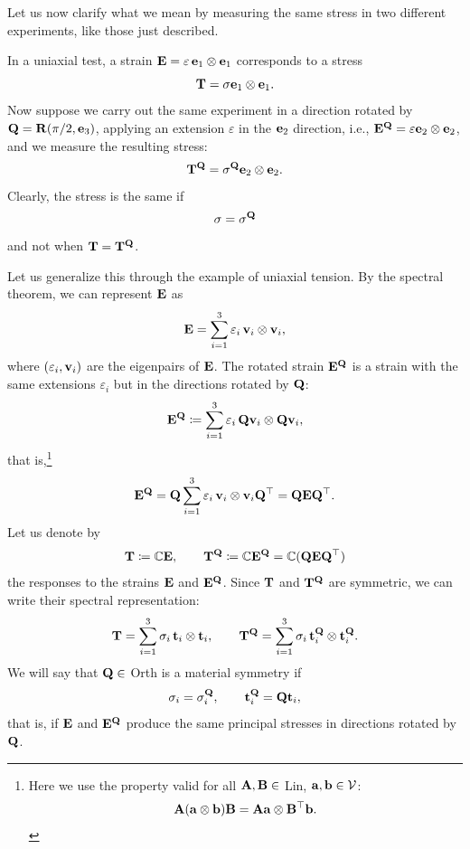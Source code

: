 Let us now clarify what we mean by measuring the same stress in two different experiments, like those just described.

In a uniaxial test, a strain $\mathbf{E}=\varepsilon\,\mathbf{e}_1\otimes\mathbf{e}_1$ corresponds to a stress
\begin{equation}
	\mathbf{T} =\sigma \mathbf{e}_1\otimes\mathbf{e}_1.
\end{equation}
Now suppose we carry out the same experiment in a direction rotated by $\mathbf{Q}=\mathbf{R} (\pi/2, \mathbf{e}_3)$, applying an extension $\varepsilon$ in the $\mathbf{e}_2$ direction, i.e., $\mathbf{E}^{\mathbf{Q}}=\varepsilon\mathbf{e}_2\otimes\mathbf{e}_2$, and we measure the resulting stress:
\begin{equation}
	\mathbf{T}^{\mathbf{Q}} =\sigma^{\mathbf{Q}}\mathbf{e}_2\otimes \mathbf{e}_2.
\end{equation}
Clearly, the stress is the same if
\begin{equation}
	\sigma=\sigma^{\mathbf{Q}}
\end{equation}
and not when $\mathbf{T} =\mathbf{T} ^{\mathbf{Q}}$.

Let us generalize this through the example of uniaxial tension. By the spectral theorem, we can represent $\mathbf{E}$ as
\begin{equation}\label{espettr1}
	\mathbf{E}=\sum_{i=1}^{3}\varepsilon_i\, \mathbf{v}_i\otimes \mathbf{v}_i,
\end{equation}
where $(\varepsilon_i, \mathbf{v}_i)$ are the eigenpairs of $\mathbf{E}$. The rotated strain $\mathbf{E}^{\mathbf{Q}}$ is a strain with the same extensions $\varepsilon_i$ but in the directions rotated by $\mathbf{Q}$:
\begin{equation}
	\mathbf{E}^{\mathbf{Q}}\coloneqq \sum_{i=1}^{3}\varepsilon_i\, \mathbf{Q}\mathbf{v}_i\otimes \mathbf{Q}\mathbf{v}_i,
\end{equation}
that is,\footnote{Here we use the property valid for all $\mathbf{A}, \mathbf{B}\in$ Lin, $\mathbf{a}, \mathbf{b} \in \mathcal{V}$:
	\begin{equation}
		\mathbf{A}(\mathbf{a}\otimes\mathbf{b})\mathbf{B}=\mathbf{A} \mathbf{a} \otimes \mathbf{B}^\top \mathbf{b}.
\end{equation}}
\begin{equation}
	\mathbf{E}^{\mathbf{Q}}=\mathbf{Q}\sum_{i=1}^{3}\varepsilon_i\, \mathbf{v}_i\otimes \mathbf{v}_i \mathbf{Q} ^\top = \mathbf{Q} \mathbf{E} \mathbf{Q}^\top.
\end{equation}
Let us denote by 
\begin{equation}
	\mathbf{T} \coloneqq\mathbb{C} \mathbf{E}, \qquad \mathbf{T}^{\mathbf{Q}}\coloneqq \mathbb{C} \mathbf{E}^{\mathbf{Q}}=\mathbb{C} (\mathbf{Q} \mathbf{E} \mathbf{Q}^\top)
\end{equation}
the responses to the strains $\mathbf{E}$ and $\mathbf{E}^{\mathbf{Q}}$. Since $\mathbf{T}$ and $\mathbf{T}^{\mathbf{Q}}$ are symmetric, we can write their spectral representation:
\begin{equation}
	\mathbf{T}=\sum_{i=1}^{3}\sigma_i\, \mathbf{t}_i\otimes \mathbf{t}_i, \qquad 	\mathbf{T}^{\mathbf{Q}}=\sum_{i=1}^{3}\sigma_i\, \mathbf{t}^{\mathbf{Q}}_i\otimes \mathbf{t}^{\mathbf{Q}}_i.
\end{equation}
We will say that $\mathbf{Q}\in$ Orth is a material symmetry if
\begin{equation}
	\sigma_i=\sigma_i^{\mathbf{Q}}, \qquad \mathbf{t}_i^{\mathbf{Q}}=\mathbf{Q} \mathbf{t}_i,
\end{equation}
that is, if $\mathbf{E}$ and $\mathbf{E}^{\mathbf{Q}}$ produce the same principal stresses in directions rotated by $\mathbf{Q}$. 

